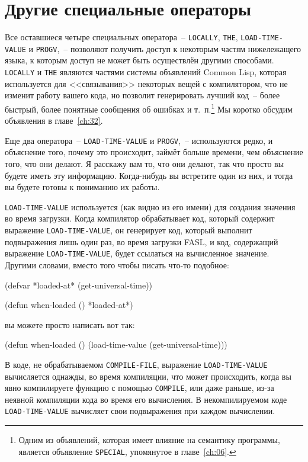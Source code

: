 \section{Другие специальные операторы}

Все оставшиеся четыре специальных оператора~-- \lstinline{LOCALLY}, \lstinline{THE},
\lstinline{LOAD-TIME-VALUE} и \lstinline{PROGV},~-- позволяют получить доступ к некоторым частям
нижележащего языка, к которым доступ не может быть осуществлён другими способами.
\lstinline{LOCALLY} и \lstinline{THE} являются частями системы объявлений Common Lisp, которая
используется для <<связывания>> некоторых вещей с компилятором, что не изменит работу
вашего кода, но позволит генерировать лучший код~-- более быстрый, более понятные
сообщения об ошибках и т.~п.\footnote{Одним из объявлений, которая имеет влияние на
  семантику программы, является объявление \lstinline{SPECIAL}, упомянутое в главе~\ref{ch:06}.}
  Мы коротко обсудим объявления в главе~\ref{ch:32}.

Еще два оператора~-- \lstinline{LOAD-TIME-VALUE} и \lstinline{PROGV},~-- используются редко, и
объяснение того, почему это происходит, займёт больше времени, чем объяснение того, что
они делают. Я расскажу вам то, что они делают, так что просто вы будете иметь эту
информацию. Когда-нибудь вы встретите один из них, и тогда вы будете готовы к пониманию их
работы.

\lstinline{LOAD-TIME-VALUE} используется (как видно из его имени) для создания значения во
время загрузки.  Когда компилятор обрабатывает код, который содержит выражение
\lstinline{LOAD-TIME-VALUE}, он генерирует код, который выполнит подвыражения лишь один раз, во
время загрузки FASL, и код, содержащий выражение \lstinline{LOAD-TIME-VALUE}, будет ссылаться на
вычисленное значение.  Другими словами, вместо того чтобы писать что-то подобное:

\begin{myverb}
(defvar *loaded-at* (get-universal-time))

(defun when-loaded () *loaded-at*)
\end{myverb}

\noindent{}вы можете просто написать вот так:

\begin{myverb}
(defun when-loaded () (load-time-value (get-universal-time)))
\end{myverb}

В коде, не обрабатываемом \lstinline{COMPILE-FILE}, выражение \lstinline{LOAD-TIME-VALUE}
вычисляется однажды, во время компиляции, что может происходить, когда вы явно компилируете
функцию с помощью \lstinline{COMPILE}, или даже раньше, из-за неявной компиляции кода во время
его вычисления.  В некомпилируемом коде \lstinline{LOAD-TIME-VALUE} вычисляет свои
подвыражения при каждом вычислении.

